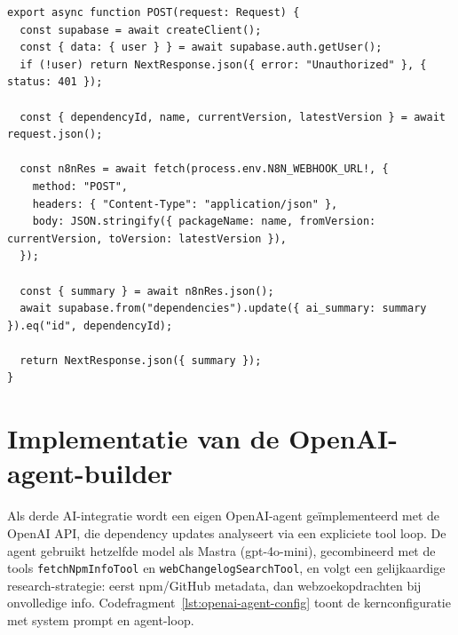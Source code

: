 \begin{listing}[H]
\begin{verbatim}
export async function POST(request: Request) {
  const supabase = await createClient();
  const { data: { user } } = await supabase.auth.getUser();
  if (!user) return NextResponse.json({ error: "Unauthorized" }, { status: 401 });

  const { dependencyId, name, currentVersion, latestVersion } = await request.json();

  const n8nRes = await fetch(process.env.N8N_WEBHOOK_URL!, {
    method: "POST",
    headers: { "Content-Type": "application/json" },
    body: JSON.stringify({ packageName: name, fromVersion: currentVersion, toVersion: latestVersion }),
  });

  const { summary } = await n8nRes.json();
  await supabase.from("dependencies").update({ ai_summary: summary }).eq("id", dependencyId);

  return NextResponse.json({ summary });
}
\end{verbatim}
\caption{Codefragment: Next.js-route die de n8n-workflow aanroept}
\label{lst:n8n-route}
\end{listing}

\section{Implementatie van de OpenAI-agent-builder}
\label{sec:openai-agent-builder-implementatie}

Als derde AI-integratie wordt een eigen OpenAI-agent geïmplementeerd met de OpenAI API, die dependency updates analyseert via een expliciete tool loop. De agent gebruikt hetzelfde model als Mastra (gpt-4o-mini), gecombineerd met de tools \texttt{fetchNpmInfoTool} en \texttt{webChangelogSearchTool}, en volgt een gelijkaardige research-strategie: eerst npm/GitHub metadata, dan webzoekopdrachten bij onvolledige info. Codefragment~\ref{lst:openai-agent-config} toont de kernconfiguratie met system prompt en agent-loop.

